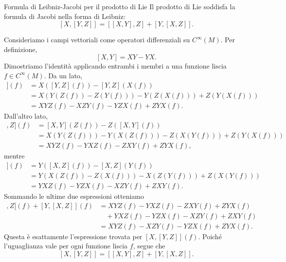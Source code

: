 \documentclass[a4paper]{article}
\begin{document}
\begin{snippetproposition}{Formula di Leibniz-Jacobi per il prodotto di Lie}
    Il prodotto di Lie soddisfa la formula di Jacobi nella forma di Leibniz:
    \[
        [X,[Y,Z]]
        =
        [[X,Y],Z]+[Y,[X,Z]].
    \]
\end{snippetproposition}

\begin{snippetproof}{}
    Consideriamo i campi vettoriali come operatori differenziali su \(C^\infty(M)\). Per definizione,
    \[
        [X,Y]=XY-YX.
    \]
    Dimostriamo l'identità applicando entrambi i membri a una funzione liscia \(f\in C^\infty(M)\). Da un lato,
    \begin{align*}
        [X,[Y,Z]](f)
        &=
        X([Y,Z](f))-[Y,Z](X(f))\\
        &=
        X(Y(Z(f))-Z(Y(f)))-Y(Z(X(f)))+Z(Y(X(f)))\\
        &=
        XYZ(f)-XZY(f)-YZX(f)+ZYX(f).
    \end{align*}
    Dall'altro lato,
    \begin{align*}
        [[X,Y],Z](f)
        &=
        [X,Y](Z(f))-Z([X,Y](f))\\
        &=
        X(Y(Z(f)))-Y(X(Z(f)))-Z(X(Y(f)))+Z(Y(X(f)))\\
        &=
        XYZ(f)-YXZ(f)-ZXY(f)+ZYX(f),
    \end{align*}
    mentre
    \begin{align*}
        [Y,[X,Z]](f)
        &=
        Y([X,Z](f))-[X,Z](Y(f))\\
        &=
        Y(X(Z(f))-Z(X(f)))-X(Z(Y(f)))+Z(X(Y(f)))\\
        &=
        YXZ(f)-YZX(f)-XZY(f)+ZXY(f).
    \end{align*}
    Sommando le ultime due espressioni otteniamo
    \begin{align*}
        [[X,Y],Z](f)+[Y,[X,Z]](f)
        &=
        XYZ(f)-YXZ(f)-ZXY(f)+ZYX(f)\\
        &\quad +YXZ(f)-YZX(f)-XZY(f)+ZXY(f)\\
        &=
        XYZ(f)-XZY(f)-YZX(f)+ZYX(f).
    \end{align*}
    Questa è esattamente l'espressione trovata per \([X,[Y,Z]](f)\). Poiché l'uguaglianza vale per ogni funzione liscia \(f\), segue che
    \[
        [X,[Y,Z]]
        =
        [[X,Y],Z]+[Y,[X,Z]].
    \]
\end{snippetproof}
\end{document}
